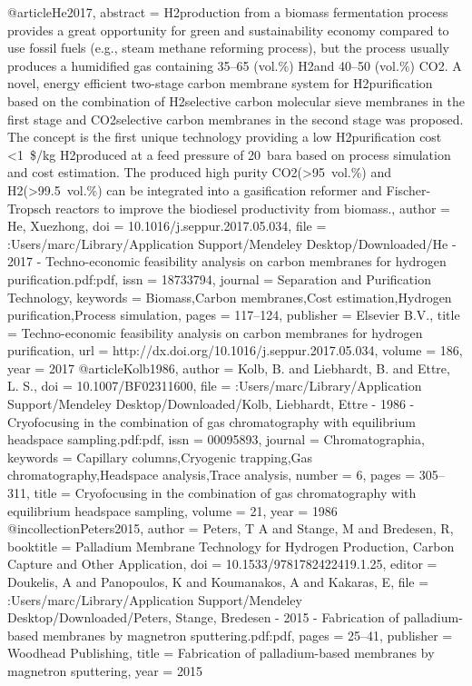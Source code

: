 @article{He2017,
abstract = {H2production from a biomass fermentation process provides a great opportunity for green and sustainability economy compared to use fossil fuels (e.g., steam methane reforming process), but the process usually produces a humidified gas containing 35–65 (vol.{\%}) H2and 40–50 (vol.{\%}) CO2. A novel, energy efficient two-stage carbon membrane system for H2purification based on the combination of H2selective carbon molecular sieve membranes in the first stage and CO2selective carbon membranes in the second stage was proposed. The concept is the first unique technology providing a low H2purification cost {\textless}1 {\$}/kg H2produced at a feed pressure of 20 bara based on process simulation and cost estimation. The produced high purity CO2({\textgreater}95 vol.{\%}) and H2({\textgreater}99.5 vol.{\%}) can be integrated into a gasification reformer and Fischer-Tropsch reactors to improve the biodiesel productivity from biomass.},
author = {He, Xuezhong},
doi = {10.1016/j.seppur.2017.05.034},
file = {:Users/marc/Library/Application Support/Mendeley Desktop/Downloaded/He - 2017 - Techno-economic feasibility analysis on carbon membranes for hydrogen purification.pdf:pdf},
issn = {18733794},
journal = {Separation and Purification Technology},
keywords = {Biomass,Carbon membranes,Cost estimation,Hydrogen purification,Process simulation},
pages = {117--124},
publisher = {Elsevier B.V.},
title = {{Techno-economic feasibility analysis on carbon membranes for hydrogen purification}},
url = {http://dx.doi.org/10.1016/j.seppur.2017.05.034},
volume = {186},
year = {2017}
}
@article{Kolb1986,
author = {Kolb, B. and Liebhardt, B. and Ettre, L. S.},
doi = {10.1007/BF02311600},
file = {:Users/marc/Library/Application Support/Mendeley Desktop/Downloaded/Kolb, Liebhardt, Ettre - 1986 - Cryofocusing in the combination of gas chromatography with equilibrium headspace sampling.pdf:pdf},
issn = {00095893},
journal = {Chromatographia},
keywords = {Capillary columns,Cryogenic trapping,Gas chromatography,Headspace analysis,Trace analysis},
number = {6},
pages = {305--311},
title = {{Cryofocusing in the combination of gas chromatography with equilibrium headspace sampling}},
volume = {21},
year = {1986}
}
@incollection{Peters2015,
author = {Peters, T A and Stange, M and Bredesen, R},
booktitle = {Palladium Membrane Technology for Hydrogen Production, Carbon Capture and Other Application},
doi = {10.1533/9781782422419.1.25},
editor = {Doukelis, A and Panopoulos, K and Koumanakos, A and Kakaras, E},
file = {:Users/marc/Library/Application Support/Mendeley Desktop/Downloaded/Peters, Stange, Bredesen - 2015 - Fabrication of palladium-based membranes by magnetron sputtering.pdf:pdf},
pages = {25--41},
publisher = {Woodhead Publishing},
title = {{Fabrication of palladium-based membranes by magnetron sputtering}},
year = {2015}
}
